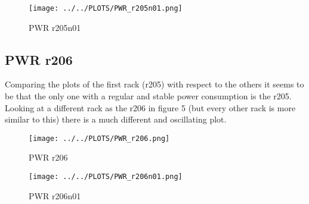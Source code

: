 \vspace{-5pt}

\begin{figure}[H]
\centering
\texttt{[image: ../../PLOTS/PWR\_r205n01.png]}
\captionsetup{skip=-10pt}
\caption{PWR r205n01}
\label{fig:PWR_r205n01}
\end{figure}
\clearpage

\subsection{PWR r206}
Comparing the plots of the first rack (r205) with respect to the others it seems to be that the only one with a regular and stable power consumption is the r205.\\ Looking at a different rack as the r206 in figure 5 (but every other rack is more similar to this) there is a much different and oscillating plot. 

\vspace{-12pt}

\begin{figure}[H]
\centering
\texttt{[image: ../../PLOTS/PWR\_r206.png]}
\captionsetup{skip=-10pt}
\caption{PWR r206}
\label{fig:PWR_r206}
\end{figure}

\vspace{-20pt}

\begin{figure}[H]
\centering
\texttt{[image: ../../PLOTS/PWR\_r206n01.png]}
\captionsetup{skip=-10pt}
\caption{PWR r206n01}
\label{fig:PWR_r206n01}
\end{figure}

